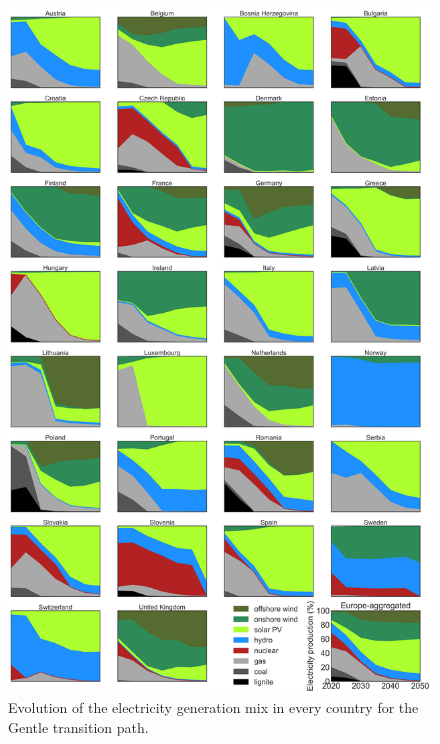 \documentclass[3p]{elsarticle} %
\begin{document}
\begin{figure}[!h]
\centering
\includegraphics[width=0.8\columnwidth]{figures/electricity_production_Base_go.png}
\caption{Evolution of the electricity generation mix in every country for the Gentle transition path.} \label{fig_primary_energy} 
\end{figure}
\end{document}
